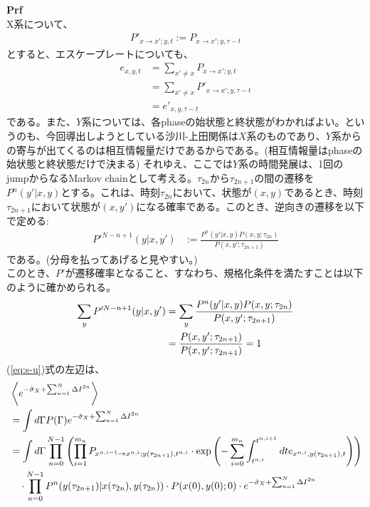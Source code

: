 \documentclass[a4paper,11pt]{jsarticle}
\numberwithin{equation}{section}
\begin{document}
\textbf{Prf}\\
X系について、
\begin{align}
    P'_{x \to x'; y, t} := P_{x\to x'; y, \tau-t}
\end{align}
とすると、エスケープレートについても、
\begin{align}
    e_{x,y,t} &=\sum_{x'\neq x} P_{x\to x'; y, t} \\
    &= \sum_{x'\neq x} P'_{x\to x'; y, \tau-t} \\
    &=e'_{x,y,\tau-t}
\end{align}
である。また、$Y$系については、各phaseの始状態と終状態がわかればよい。というのも、今回導出しようとしている沙川-上田関係は$X$系のものであり、$Y$系からの寄与が出てくるのは相互情報量だけであるからである。(相互情報量はphaseの始状態と終状態だけで決まる)
それゆえ、ここでは$Y$系の時間発展は、1回のjumpからなるMarkov chainとして考える。$\tau_{2n}$から$\tau_{2n+1}$の間の遷移を$P^n(y'|x, y)$とする。これは、時刻$\tau_{2n}$において、状態が$(x, y)$であるとき、時刻$\tau_{2n+1}$において状態が$(x, y')$になる確率である。このとき、逆向きの遷移を以下で定める:
\begin{align}
    P'^{N-n+1}(y|x, y') &:= \frac{P^n(y'|x, y) P(x, y; \tau_{2n})}{P(x, y'; \tau_{2n+1})} 
\end{align}
である。(分母を払ってあげると見やすい。)\\
このとき、$P'$が遷移確率となること、すなわち、規格化条件を満たすことは以下のように確かめられる。
\begin{align}
    \sum_{y} P'^{N-n+1}(y|x, y') &= \sum_{y} \frac{P^n(y'|x, y) P(x, y; \tau_{2n})}{P(x, y'; \tau_{2n+1})} \notag \\
    &= \frac{P(x, y'; \tau_{2n+1})}{P(x, y'; \tau_{2n+1})} = 1 
\end{align}
(\ref{eq:s-u})式の左辺は、
\begin{align}
    &\left\langle e^{-\hat{\sigma}_X + \sum_{n=1}^N \Delta I^{2n}} \right\rangle \\
    &= \int d\Gamma P(\Gamma) e^{-\hat{\sigma}_X + \sum_{n=1}^N \Delta I^{2n}} \\
    &= \int d\Gamma \prod_{n=0}^{N-1} \left( \prod_{i=1}^{m_n} P_{x^{n,i-1} \to x^{n,i}; y(\tau_{2n+1}), t^{n,i}} \cdot \exp \left( -\sum_{i=0}^{m_n} \int_{t^{n,i}}^{t^{n,i+1}} dt e_{x^{n,i}, y(\tau_{2n+1}), t} \right) \right) \notag \\
    &\quad \cdot \prod_{n=0}^{N-1} P^n(y(\tau_{2n+1}) | x(\tau_{2n}), y(\tau_{2n})) \cdot P(x(0), y(0); 0) \cdot e^{-\hat{\sigma}_X + \sum_{n=1}^N \Delta I^{2n}} 
\end{align}
\end{document}
